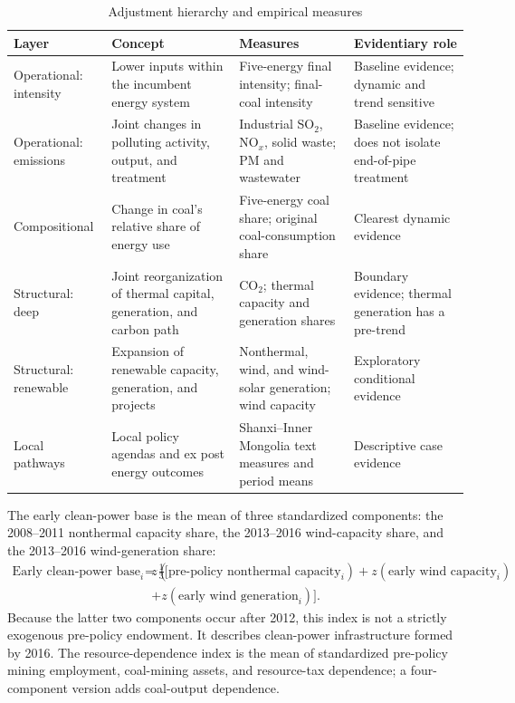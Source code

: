 \documentclass[11pt]{article}
\begin{document}
\begin{table}[H]
\centering
\caption{Adjustment hierarchy and empirical measures}
\label{tab:mapping}
\begin{tabularx}{\textwidth}{p{3.1cm}p{4.0cm}X p{2.6cm}}
\toprule
Layer & Concept & Measures & Evidentiary role \\
\midrule
Operational: intensity & Lower inputs within the incumbent energy system & Five-energy final intensity; final-coal intensity & Baseline evidence; dynamic and trend sensitive \\
Operational: emissions & Joint changes in polluting activity, output, and treatment & Industrial SO$_2$, NO$_x$, solid waste; PM and wastewater & Baseline evidence; does not isolate end-of-pipe treatment \\
Compositional & Change in coal's relative share of energy use & Five-energy coal share; original coal-consumption share & Clearest dynamic evidence \\
Structural: deep & Joint reorganization of thermal capital, generation, and carbon path & CO$_2$; thermal capacity and generation shares & Boundary evidence; thermal generation has a pre-trend \\
Structural: renewable & Expansion of renewable capacity, generation, and projects & Nonthermal, wind, and wind-solar generation; wind capacity & Exploratory conditional evidence \\
Local pathways & Local policy agendas and ex post energy outcomes & Shanxi--Inner Mongolia text measures and period means & Descriptive case evidence \\
\bottomrule
\end{tabularx}
\end{table}

The early clean-power base is the mean of three standardized components: the 2008--2011 nonthermal capacity share, the 2013--2016 wind-capacity share, and the 2013--2016 wind-generation share:
\begin{equation}
\begin{aligned}
\text{Early clean-power base}_{i}=\frac{1}{3}\big[&z(\text{pre-policy nonthermal capacity}_{i})
+z(\text{early wind capacity}_{i})\\
&+z(\text{early wind generation}_{i})\big].
\end{aligned}
\end{equation}
Because the latter two components occur after 2012, this index is not a strictly exogenous pre-policy endowment. It describes clean-power infrastructure formed by 2016. The resource-dependence index is the mean of standardized pre-policy mining employment, coal-mining assets, and resource-tax dependence; a four-component version adds coal-output dependence.
\end{document}
